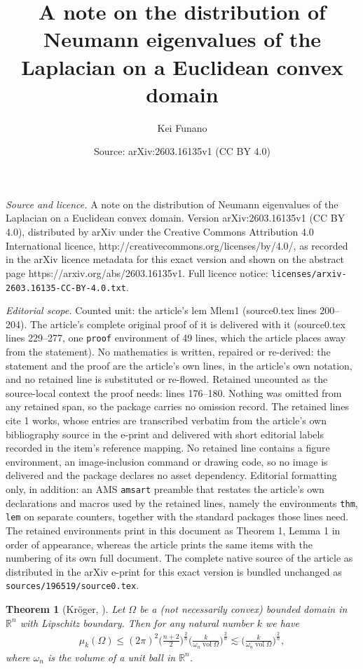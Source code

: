 \documentclass[10pt,a4paper]{amsart}
\title{A note on the distribution of Neumann eigenvalues of the Laplacian on a Euclidean convex domain}
\author{Kei Funano}
\date{Source: arXiv:2603.16135v1 (CC BY 4.0)}
\newtheorem{thm}{Theorem}
\newcommand{\vol}{\operatorname{vol}}
\begin{document}
\maketitle

\noindent\emph{Source and licence.} A note on the distribution of Neumann eigenvalues of the Laplacian on a Euclidean convex domain. Version arXiv:2603.16135v1 (CC BY 4.0), distributed by arXiv under the Creative Commons Attribution 4.0 International licence, http://creativecommons.org/licenses/by/4.0/, as recorded in the arXiv licence metadata for this exact version and shown on the abstract page https://arxiv.org/abs/2603.16135v1. Full licence notice: \texttt{licenses/arxiv-2603.16135-CC-BY-4.0.txt}.\par\smallskip

\noindent\textit{Editorial scope.} Counted unit: the article's lem Mlem1 (source0.tex lines 200--204). The article's complete original proof of it is delivered with it (source0.tex lines 229--277, one \texttt{proof} environment of 49 lines, which the article places away from the statement). No mathematics is written, repaired or re-derived: the statement and the proof are the article's own lines, in the article's own notation, and no retained line is substituted or re-flowed.  Retained uncounted as the source-local context the proof needs: lines 176--180.  Nothing was omitted from any retained span, so the package carries no omission record.  The retained lines cite 1 works, whose entries are transcribed verbatim from the article's own bibliography source in the e-print and delivered with short editorial labels recorded in the item's reference mapping.  No retained line contains a figure environment, an image-inclusion command or drawing code, so no image is delivered and the package declares no asset dependency.  Editorial formatting only, in addition: an AMS \texttt{amsart} preamble that restates the article's own declarations and macros used by the retained lines, namely the environments \texttt{thm}, \texttt{lem} on separate counters, together with the standard packages those lines need.  The retained environments print in this document as Theorem 1, Lemma 1 in order of appearance, whereas the article prints the same items with the numbering of its own full document.  The complete native source of the article as distributed in the arXiv e-print for this exact version is bundled unchanged as \texttt{sources/196519/source0.tex}.
\begin{thm}[{Kr\"{o}ger, \cite[Corollary 2]{Kr2}}]\label{Kr ineq2}Let $\Omega$ be a (not necessarily convex) bounded domain in $\mathbb{R}^n$ with Lipschitz boundary. Then for any natural number $k$ we have
\begin{align*}
    \mu_k(\Omega)\leq (2\pi)^2\Big(\frac{n+2}{2}\Big)^{\frac{2}{n}}\Big(\frac{k}{\omega_n \vol \Omega}\Big)^{\frac{2}{n}}\lesssim \Big(\frac{k}{\omega_n \vol \Omega}\Big)^{\frac{2}{n}},
\end{align*}where $\omega_n$ is the volume of a unit ball in $\mathbb{R}^n$.
\end{thm}
\end{document}
